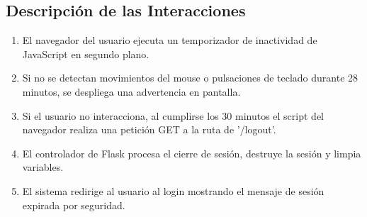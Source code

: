 \subsection{Descripción de las Interacciones}
\begin{enumerate}
    \item El navegador del usuario ejecuta un temporizador de inactividad de JavaScript en segundo plano.
    \item Si no se detectan movimientos del mouse o pulsaciones de teclado durante 28 minutos, se despliega una advertencia en pantalla.
    \item Si el usuario no interacciona, al cumplirse los 30 minutos el script del navegador realiza una petición GET a la ruta de '/logout'.
    \item El controlador de Flask procesa el cierre de sesión, destruye la sesión y limpia variables.
    \item El sistema redirige al usuario al login mostrando el mensaje de sesión expirada por seguridad.
\end{enumerate}
